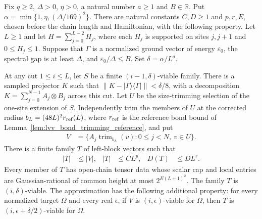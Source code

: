 \begin{lemma}
    \label{lem:lvv_rational_sampled_successor}
    \leanok
    Fix $q\ge2$, $\Delta>0$, $\eta>0$, a natural number $a\ge1$ and
    $B\in\mathbb R$. Put $\alpha=\min\{1,\eta,(\Delta/169)^2\}$.
    There are natural constants $C,D\ge1$ and $p,r,E$, chosen before
    the chain length and Hamiltonian, with the following property.
    Let $L\ge1$ and let $H=\sum_{j=0}^{L-2}H_j$, where each $H_j$ is
    supported on sites $j,j+1$ and $0\le H_j\le1$. Suppose that
    $\Gamma$ is a normalized ground vector of energy $\varepsilon_0$,
    the spectral gap is at least $\Delta$, and
    $\varepsilon_0/\Delta\le B$. Set $\delta=\alpha/L^a$.

    At any cut $1\le i\le L$, let $S$ be a finite
    $(i-1,\delta)$-viable family. There is a sampled projector $K$ such
    that $\|K-|\Gamma\rangle\langle\Gamma|\|<\delta/8$, with a
    decomposition $K=\sum_{j=0}^{N-1}A_j\otimes B_j$ across this cut.
    Let $U$ be the size-trimming selection of the one-site extension of
    $S$. Independently trim the members of $U$ at the corrected radius
    $b_L=(48L)^2r_{\rm ref}(L)$, where $r_{\rm ref}$ is the reference
    bond bound of Lemma~\ref{lem:lvv_bond_trimming_reference}, and put
    \begin{align*}
        V & =\{A_j\operatorname{trim}_{b_L}(v):0\le j<N,\ v\in U\}.
    \end{align*}
    There is a finite family $T$ of left-block vectors such that
    \begin{align*}
        |T| & \le |V|, & |T| & \le CL^p, & D(T) & \le DL^r.
    \end{align*}
    Every member of $T$ has open-chain tensor data whose scalar cap and
    local entries are Gaussian-rational of common height at most
    $2^{E(L+1)^2}$. The family $T$ is $(i,\delta)$-viable.
    The approximation has the following additional property: for every
    normalized target $\Omega$ and every real $\epsilon$, if $V$ is
    $(i,\epsilon)$-viable for $\Omega$, then $T$ is
    $(i,\epsilon+\delta/2)$-viable for $\Omega$.
\end{lemma}
